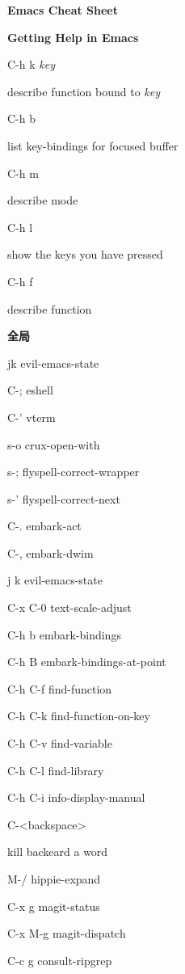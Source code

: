 \documentclass[10pt]{article}
\renewcommand\section[1]{\bigskip\par\textbf{\color{heading}\large#1}\smallskip}
\newcommand\humanreadable[1]{{\par\color{default}\small\sffamily#1}}
\newcommand\meta[1]{\textlangle\textit{#1}\textrangle}
\begin{document}
\begin{multicols}{4}

  \setlength{\columnsep}{1cm}
  \begin{center}
    \LARGE\color{heading}\textbf{Emacs Cheat Sheet}
  \end{center}

  \section{Getting Help in Emacs}
  \begin{keylist}
  \item[C-h k \meta{key}] \humanreadable{describe function bound to \meta{key}}
  \item[C-h b] \humanreadable{list key-bindings for focused buffer}
  \item[C-h m] \humanreadable{describe mode}
  \item[C-h l] \humanreadable{show the keys you have pressed}
  \item[C-h f] \humanreadable{describe function}
  \end{keylist}

  \section{全局}
  \begin{keylist}
  \item[jk] evil-emacs-state
  \item[C-;] eshell
  \item[C-'] vterm
  \item[s-o] crux-open-with
  \item[s-;] flyspell-correct-wrapper
  \item[s-'] flyspell-correct-next
  \item[C-.] embark-act
  \item[C-,] embark-dwim
  \item[j k] evil-emacs-state
  \item[C-x C-0] text-scale-adjust
  \item[C-h b] embark-bindings
  \item[C-h B] embark-bindings-at-point
  \item[C-h C-f] find-function
  \item[C-h C-k] find-function-on-key
  \item[C-h C-v] find-variable
  \item[C-h C-l] find-library
  \item[C-h C-i] info-display-manual
  \item[C-<backspace>] \humanreadable{kill backeard a word}
  \item[M-/] hippie-expand
  \item[C-x g] magit-status
  \item[C-x M-g] magit-dispatch
  \item[C-c g] consult-ripgrep
  \end{keylist}


\end{multicols}
\end{document}
